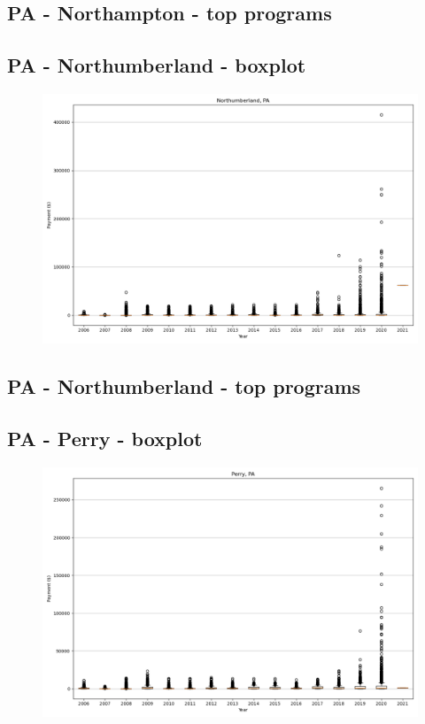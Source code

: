 \subsection*{PA - Northampton - top programs}

\newpage
\subsection*{PA - Northumberland - boxplot}
\begin{figure}[h]
\centering
\includegraphics[width=7in]{../output/boxplots/counties/Northumberland-PA_boxplot.png}
\end{figure}


\subsection*{PA - Northumberland - top programs}

\newpage
\subsection*{PA - Perry - boxplot}
\begin{figure}[h]
\centering
\includegraphics[width=7in]{../output/boxplots/counties/Perry-PA_boxplot.png}
\end{figure}


